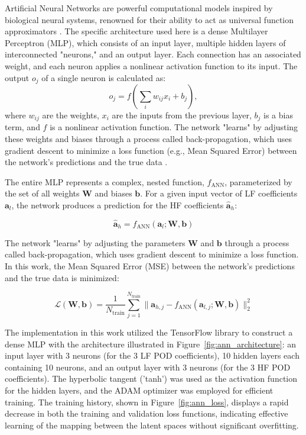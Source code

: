 \documentclass[tg, EN]{ufabcFHZh_tg}
\begin{document}
Artificial Neural Networks are powerful computational models inspired by biological neural systems, renowned for their ability to act as universal function approximators \citep{hornik1989}. The specific architecture used here is a dense Multilayer Perceptron (MLP), which consists of an input layer, multiple hidden layers of interconnected "neurons," and an output layer. Each connection has an associated weight, and each neuron applies a nonlinear activation function to its input. The output $o_j$ of a single neuron is calculated as:
\begin{equation}
o_j = f \left( \sum_{i} w_{ij} x_i + b_j \right),
\end{equation}
where $w_{ij}$ are the weights, $x_i$ are the inputs from the previous layer, $b_j$ is a bias term, and $f$ is a nonlinear activation function. The network "learns" by adjusting these weights and biases through a process called back-propagation, which uses gradient descent to minimize a loss function (e.g., Mean Squared Error) between the network's predictions and the true data \citep{yu2019}.

The entire MLP represents a complex, nested function, $f_{\text{ANN}}$, parameterized by the set of all weights $\mathbf{W}$ and biases $\mathbf{b}$. For a given input vector of LF coefficients $\mathbf{a}_l$, the network produces a prediction for the HF coefficients $\hat{\mathbf{a}}_h$:

\begin{equation}
    \hat{\mathbf{a}}_h = f_{\text{ANN}}(\mathbf{a}_l; \mathbf{W}, \mathbf{b})
\end{equation}

The network "learns" by adjusting the parameters $\mathbf{W}$ and $\mathbf{b}$ through a process called back-propagation, which uses gradient descent to minimize a loss function. In this work, the Mean Squared Error (MSE) between the network's predictions and the true data is minimized:

\begin{equation}
    \mathcal{L}(\mathbf{W}, \mathbf{b}) = \frac{1}{N_{\text{train}}} \sum_{j=1}^{N_{\text{train}}} \| \mathbf{a}_{h,j} - f_{\text{ANN}}(\mathbf{a}_{l,j}; \mathbf{W}, \mathbf{b}) \|_2^2
\end{equation}

The implementation in this work utilized the TensorFlow library to construct a dense MLP with the architecture illustrated in Figure~\ref{fig:ann_architecture}: an input layer with 3 neurons (for the 3 LF POD coefficients), 10 hidden layers each containing 10 neurons, and an output layer with 3 neurons (for the 3 HF POD coefficients). The hyperbolic tangent ('tanh') was used as the activation function for the hidden layers, and the ADAM optimizer was employed for efficient training. The training history, shown in Figure~\ref{fig:ann_loss}, displays a rapid decrease in both the training and validation loss functions, indicating effective learning of the mapping between the latent spaces without significant overfitting.
\end{document}
